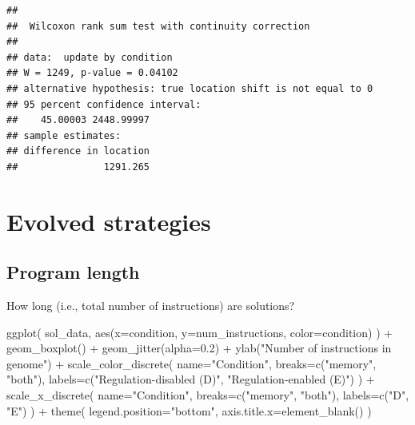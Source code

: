 \documentclass[
]{book}
\newenvironment{Shaded}{\begin{snugshade}}{\end{snugshade}}
\newcommand{\AttributeTok}[1]{\textcolor[rgb]{0.77,0.63,0.00}{#1}}
\newcommand{\FloatTok}[1]{\textcolor[rgb]{0.00,0.00,0.81}{#1}}
\newcommand{\FunctionTok}[1]{\textcolor[rgb]{0.00,0.00,0.00}{#1}}
\newcommand{\NormalTok}[1]{#1}
\newcommand{\SpecialCharTok}[1]{\textcolor[rgb]{0.00,0.00,0.00}{#1}}
\newcommand{\StringTok}[1]{\textcolor[rgb]{0.31,0.60,0.02}{#1}}
\begin{document}
\begin{verbatim}
## 
##  Wilcoxon rank sum test with continuity correction
## 
## data:  update by condition
## W = 1249, p-value = 0.04102
## alternative hypothesis: true location shift is not equal to 0
## 95 percent confidence interval:
##    45.00003 2448.99997
## sample estimates:
## difference in location 
##               1291.265
\end{verbatim}

\hypertarget{evolved-strategies-1}{%
\section{Evolved strategies}\label{evolved-strategies-1}}

\hypertarget{program-length-2}{%
\subsection{Program length}\label{program-length-2}}

How long (i.e., total number of instructions) are solutions?

\begin{Shaded}
\begin{Highlighting}[]
\FunctionTok{ggplot}\NormalTok{( sol\_data, }\FunctionTok{aes}\NormalTok{(}\AttributeTok{x=}\NormalTok{condition, }\AttributeTok{y=}\NormalTok{num\_instructions, }\AttributeTok{color=}\NormalTok{condition) ) }\SpecialCharTok{+}
  \FunctionTok{geom\_boxplot}\NormalTok{() }\SpecialCharTok{+}
  \FunctionTok{geom\_jitter}\NormalTok{(}\AttributeTok{alpha=}\FloatTok{0.2}\NormalTok{) }\SpecialCharTok{+}
  \FunctionTok{ylab}\NormalTok{(}\StringTok{"Number of instructions in genome"}\NormalTok{) }\SpecialCharTok{+}
  \FunctionTok{scale\_color\_discrete}\NormalTok{(}
    \AttributeTok{name=}\StringTok{"Condition"}\NormalTok{,}
    \AttributeTok{breaks=}\FunctionTok{c}\NormalTok{(}\StringTok{"memory"}\NormalTok{, }\StringTok{"both"}\NormalTok{),}
    \AttributeTok{labels=}\FunctionTok{c}\NormalTok{(}\StringTok{"Regulation{-}disabled (D)"}\NormalTok{, }\StringTok{"Regulation{-}enabled (E)"}\NormalTok{)}
\NormalTok{  ) }\SpecialCharTok{+}
  \FunctionTok{scale\_x\_discrete}\NormalTok{(}
    \AttributeTok{name=}\StringTok{"Condition"}\NormalTok{,}
    \AttributeTok{breaks=}\FunctionTok{c}\NormalTok{(}\StringTok{"memory"}\NormalTok{, }\StringTok{"both"}\NormalTok{),}
    \AttributeTok{labels=}\FunctionTok{c}\NormalTok{(}\StringTok{"D"}\NormalTok{, }\StringTok{"E"}\NormalTok{)}
\NormalTok{  ) }\SpecialCharTok{+}
  \FunctionTok{theme}\NormalTok{(}
    \AttributeTok{legend.position=}\StringTok{"bottom"}\NormalTok{,}
    \AttributeTok{axis.title.x=}\FunctionTok{element\_blank}\NormalTok{()}
\NormalTok{  )}
\end{Highlighting}
\end{Shaded}
\end{document}
